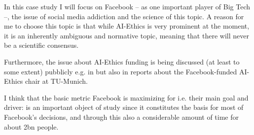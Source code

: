 In this case study I will focus on Facebook -- as one important player of Big Tech --, the issue of social media addiction and the science of this topic.
A reason for me to choose this topic is that while AI-Ethics is very prominent at the moment, it is an inherently ambiguous and normative topic, meaning that there will never be a scientific consensus. 

Furthermore, the issue about AI-Ethics funding is being discussed (at least to some extent) pubblicly e.g. in \citep{abdalla_grey_2021} but also in reports about the Facebook-funded AI-Ethics chair at TU-Munich.

I think that the basic metric Facebook is maximizing for i.e. their main goal and driver:  is an important object of study since it constitutes the basis for most of Facebook's decisions, and through this also a considerable amount of time for about 2bn people.
